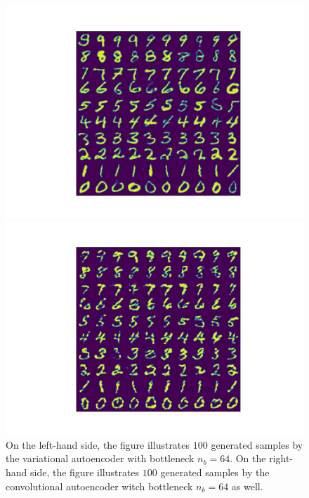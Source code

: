 \begin{figure}
\begin{center}
\begin{minipage}[b]{0.49\linewidth}
      \includegraphics[trim = 15mm 10mm 15mm 10mm, clip, width=\linewidth]{convolutional_VAE_snd_KL_4e-5_10k_epochs_64D_generated}
	\end{minipage}
   \begin{minipage}[b]{0.49\linewidth}
      \includegraphics[trim = 15mm 10mm 15mm 10mm, clip, width=\linewidth]{convolutional_AE_generated}
	\end{minipage}
\end{center}
\caption{On the left-hand side, the figure illustrates $100$ generated samples by the variational autoencoder with bottleneck $n_b=64$. On the right-hand side, the figure illustrates $100$ generated samples by the convolutional autoencoder witch bottleneck $n_b=64$ as well.}\label{fig:convolutional_VAE_vs_convolutional_AE}
\end{figure}


